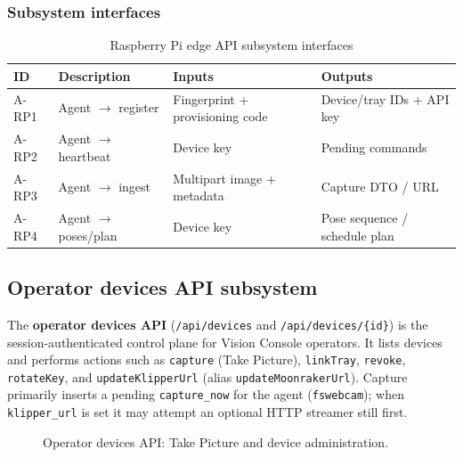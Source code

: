 \subsubsection{Subsystem interfaces}
\begin{table}[H]
\centering
\small
\begin{tabular}{|p{0.9cm}|p{3.4cm}|p{3.0cm}|p{3.5cm}|}
\hline
\textbf{ID} & \textbf{Description} & \textbf{Inputs} & \textbf{Outputs} \\
\hline
A-RP1 & Agent $\rightarrow$ register & Fingerprint + provisioning code & Device/tray IDs + API key \\
\hline
A-RP2 & Agent $\rightarrow$ heartbeat & Device key & Pending commands \\
\hline
A-RP3 & Agent $\rightarrow$ ingest & Multipart image + metadata & Capture DTO / URL \\
\hline
A-RP4 & Agent $\rightarrow$ poses/plan & Device key & Pose sequence / schedule plan \\
\hline
\end{tabular}
\caption{Raspberry Pi edge API subsystem interfaces}
\end{table}

\subsection{Operator devices API subsystem}

The \textbf{operator devices API} (\texttt{/api/devices} and \texttt{/api/devices/\{id\}}) is the session-authenticated control plane for Vision Console operators. It lists devices and performs actions such as \texttt{capture} (Take Picture), \texttt{linkTray}, \texttt{revoke}, \texttt{rotateKey}, and \texttt{updateKlipperUrl} (alias \texttt{updateMoonrakerUrl}). Capture primarily inserts a pending \texttt{capture\_now} for the agent (\texttt{fswebcam}); when \texttt{klipper\_url} is set it may attempt an optional HTTP streamer still first.

\begin{figure}[H]
\centering
{}
\caption{Operator devices API: Take Picture and device administration.}
\label{fig:app-devices}
\end{figure}


